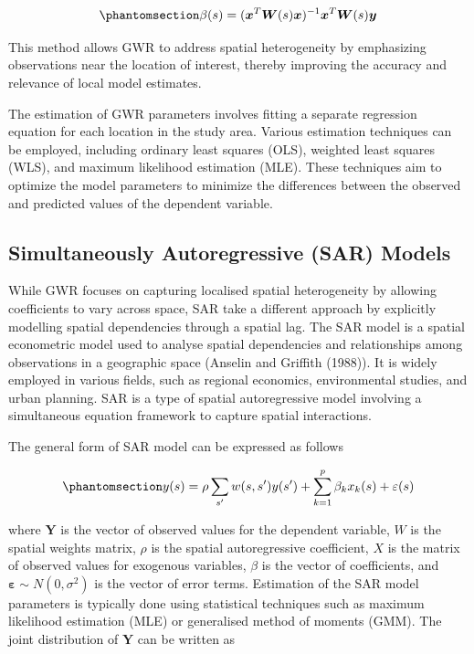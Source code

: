 \documentclass[
  default,
]{sn-jnl}
\begin{document}
\begin{equation}\phantomsection\label{eq-betagwr}{
\beta(s) = (\boldsymbol{x}^T \boldsymbol{W}(s) \boldsymbol{x})^{-1} \boldsymbol{x}^T \boldsymbol{W}(s) \boldsymbol{y}
}\end{equation}

This method allows GWR to address spatial heterogeneity by emphasizing
observations near the location of interest, thereby improving the
accuracy and relevance of local model estimates.

The estimation of GWR parameters involves fitting a separate regression
equation for each location in the study area. Various estimation
techniques can be employed, including ordinary least squares (OLS),
weighted least squares (WLS), and maximum likelihood estimation (MLE).
These techniques aim to optimize the model parameters to minimize the
differences between the observed and predicted values of the dependent
variable.

\subsection{Simultaneously Autoregressive (SAR)
Models}\label{simultaneously-autoregressive-sar-models}

While GWR focuses on capturing localised spatial heterogeneity by
allowing coefficients to vary across space, SAR take a different
approach by explicitly modelling spatial dependencies through a spatial
lag. The SAR model is a spatial econometric model used to analyse
spatial dependencies and relationships among observations in a
geographic space (Anselin and Griffith (1988)). It is widely employed in
various fields, such as regional economics, environmental studies, and
urban planning. SAR is a type of spatial autoregressive model involving
a simultaneous equation framework to capture spatial interactions.

The general form of SAR model can be expressed as follows

\begin{equation}\phantomsection\label{eq-sar}{
y(s) = \rho \sum_{s'} w(s,s') y(s') + \sum_{k=1}^p \beta_k x_k(s) + \varepsilon(s)
}\end{equation}

where \(\mathbf{Y}\) is the vector of observed values for the dependent
variable, \(W\) is the spatial weights matrix, \(\rho\) is the spatial
autoregressive coefficient, \(X\) is the matrix of observed values for
exogenous variables, \(\beta\) is the vector of coefficients, and
\(\boldsymbol{\varepsilon} \sim N(0,\sigma^2)\) is the vector of error
terms. Estimation of the SAR model parameters is typically done using
statistical techniques such as maximum likelihood estimation (MLE) or
generalised method of moments (GMM). The joint distribution of
\(\mathbf{Y}\) can be written as
\end{document}
